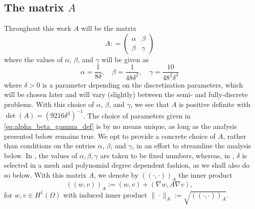 \documentclass{amsart}
\newcommand{\norm}[2]{\|{#1}\|_{{#2}}}
\newcommand{\Ainner}[2]{(\!({#1},{#2})\!)_A}
\theoremstyle{definition}
\theoremstyle{remark}
\numberwithin{equation}{section}
\begin{document}
\subsection*{The matrix $A$}

Throughout this work $A$ will be the matrix
\begin{equation}\label{eq:A_def}
 A : =      \begin{pmatrix}
     \alpha & \beta \\ \beta & \gamma
    \end{pmatrix}
\end{equation}
where the values of $\alpha$, $\beta$, and $\gamma$ will be given as
\begin{equation}\label{eq:alpha_beta_gamma_def}
    \alpha =
    \frac{1}{8\delta},
    \quad
    \beta =
    \frac{1}{48 \delta^2},
    \quad
    \gamma =
    \frac{10}{48^2 \delta ^3}
\end{equation}
where $\delta > 0$ is a parameter  {depending on the discretization parameters}, which will be chosen later and will vary (slightly) between the semi- and fully-discrete problems.
With this choice of $\alpha$, $\beta$, and $\gamma$, we see that $A$ is positive definite with $\det(A) = (9216 \delta^4)^{-1}$.
The choice of parameters given in \eqref{eq:alpha_beta_gamma_def} is by no means unique, as long as the analysis presented below remains true.  We opt to provide a concrete choice of $A$, rather than conditions on the entries $\alpha$, $\beta$, and $\gamma$, in an effort to streamline the analysis below.
In \cite{georgoulis}, the values of $\alpha,\beta,\gamma$ are taken to be fixed numbers, whereas, in \cite{DonGeoHer24}, $\delta$ is selected in a mesh and polynomial degree dependent fashion, as we shall also do so below. With this matrix $A$, we denote by $\Ainner{\cdot}{\cdot}$ the inner product
\[
	\Ainner{w}{v}:=(w,v)+ (\nabla w,A\nabla v ),
\]
for $w,v\in H^1(\Omega)$ with induced inner product $\norm{\cdot}{A}:= \sqrt{\Ainner{\cdot}{\cdot}}$.
\end{document}

